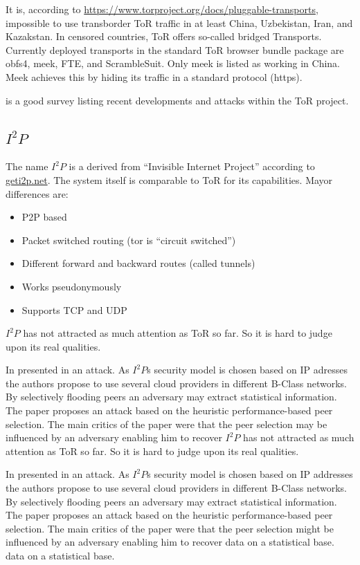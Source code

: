 It is, according to \url{https://www.torproject.org/docs/pluggable-transports}, impossible to use transborder ToR traffic in at least China, Uzbekistan, Iran, and Kazakstan. In censored countries, ToR offers so-called bridged Transports. Currently deployed transports in the standard ToR browser bundle package are obfs4, meek, FTE, and ScrambleSuit. Only meek is listed as working in China. Meek achieves this by hiding its traffic in a standard protocol (https).

\cite{saleh2018shedding} is a good survey listing recent developments and attacks within the ToR project.

\subsection{\texorpdfstring{$I^2P$}{I2P}}
The name $I^2P$ is a derived from  ``Invisible Internet Project'' according to \href{https://geti2p.net/}{geti2p.net}. The system itself is comparable to ToR for its capabilities. Mayor differences are:
\begin{itemize}
	\item P2P based
	\item Packet switched routing (tor is ``circuit switched'')
	\item Different forward and backward routes (called tunnels)
	\item Works pseudonymously
	\item Supports TCP and UDP
\end{itemize}

$I^2P$ has not attracted as much attention as ToR so far. So it is hard to judge upon its real qualities.

In \citeyear{pets2011-i2p} \citeauthor{pets2011-i2p} presented in \cite{pets2011-i2p} an attack. As $I^2P$s security model is chosen based on IP adresses the authors propose to use several cloud providers in different B-Class networks. By selectively flooding peers an adversary may extract statistical information. The paper proposes an attack based on the heuristic performance-based peer selection. The main critics of the paper were that the peer selection may be influenced by an adversary enabling him to recover $I^2P$ has not attracted as much attention as ToR so far. So it is hard to judge upon its real qualities.

In \citeyear{pets2011-i2p} \citeauthor{pets2011-i2p} presented in \cite{pets2011-i2p} an attack. As $I^2P$s security model is chosen based on IP addresses the authors propose to use several cloud providers in different B-Class networks. By selectively flooding peers an adversary may extract statistical information. The paper proposes an attack based on the heuristic performance-based peer selection. The main critics of the paper were that the peer selection might be influenced by an adversary enabling him to recover data on a statistical base.
data on a statistical base.

